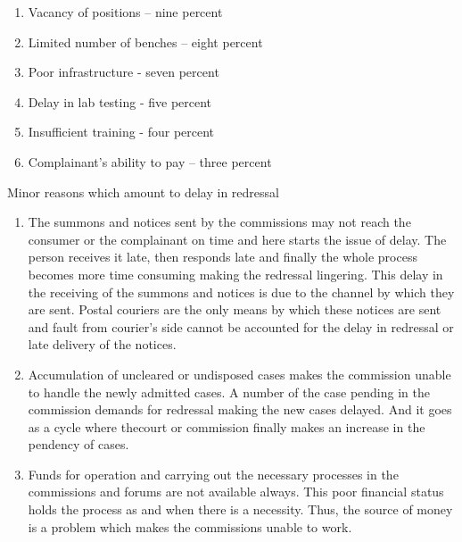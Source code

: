 \begin{multicols}{2}
\vspace{-.3cm}

\begin{enumerate}[label=$\bullet$]
\itemsep=0pt
\item Vacancy of positions – nine percent

\item Limited number of benches – eight percent

\item Poor infrastructure - seven percent

\item Delay in lab testing - five percent

\item Insufficient training - four percent

\item Complainant’s ability to pay – three percent
\end{enumerate}

\vspace{-.4cm}

\noi
Minor reasons which amount to delay in redressal

\vspace{-.3cm}

\begin{enumerate}[label=$\bullet$]
\itemsep=0pt
\item The summons and notices sent by the commissions may not reach the consumer or the
complainant on time and here starts the issue of delay. The person receives it late, then
responds late and finally the whole process becomes more time consuming making the
redressal lingering. This delay in the receiving of the summons and notices is due to the
channel by which they are sent. Postal couriers are the only means by which these
notices are sent and fault from courier’s side cannot be accounted for the delay in
redressal or late delivery of the notices.

\item Accumulation of uncleared or undisposed cases makes the commission unable to handle
the newly admitted cases. A number of the case pending in the commission demands
for redressal making the new cases delayed. And it goes as a cycle where thecourt or
commission finally makes an increase in the pendency of cases.

\item Funds for operation and carrying out the necessary processes in the commissions and
forums are not available always. This poor financial status holds the process as and
when there is a necessity. Thus, the source of money is a problem which makes the
commissions unable to work.


\end{enumerate}
\end{multicols}
